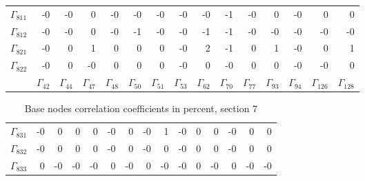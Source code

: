 {\begin{table}
\begin{center}
\begin{minipage}{\linewidth}
\begin{center}
\begin{envsmall}
\begin{center}
\begin{tabular}{rrrrrrrrrrrrrrr}
\( \Gamma_{811} \) &   -0 &   -0 &    0 &   -0 &   -0 &   -0 &   -0 &   -0 &   -1 &   -0 &    0 &   -0 &    0 &    0 \\
\( \Gamma_{812} \) &   -0 &   -0 &    0 &   -0 &   -1 &   -0 &   -0 &   -1 &   -1 &   -0 &   -0 &   -0 &   -0 &   -0 \\
\( \Gamma_{821} \) &   -0 &    0 &    1 &    0 &    0 &    0 &   -0 &    2 &   -1 &    0 &    1 &   -0 &    0 &    1 \\
\( \Gamma_{822} \) &   -0 &    0 &   -0 &    0 &    0 &    0 &   -0 &    0 &   -0 &    0 &    0 &   -0 &   -0 &    0 \\
 & \( \Gamma_{42} \) & \( \Gamma_{44} \) & \( \Gamma_{47} \) & \( \Gamma_{48} \) & \( \Gamma_{50} \) & \( \Gamma_{51} \) & \( \Gamma_{53} \) & \( \Gamma_{62} \) & \( \Gamma_{70} \) & \( \Gamma_{77} \) & \( \Gamma_{93} \) & \( \Gamma_{94} \) & \( \Gamma_{126} \) & \( \Gamma_{128} \)
\\\hline
\end{tabular}
\end{center}
\end{envsmall}
\ifhevea\else
\end{center}
\end{minipage}
\fi
\end{center}
\ifhevea\end{table}\fi
\ifhevea\begin{table}\fi%
\begin{center}
\ifhevea
\caption{Base nodes correlation coefficients in percent, section 7\label{tab:br-fit-corr7}}%
\else
\begin{minipage}{\linewidth}
\begin{center}
\label{tab:br-fit-corr7}%
\fi
\begin{envsmall}
\begin{center}
\renewcommand*{\arraystretch}{1.1}%
\begin{tabular}{rrrrrrrrrrrrrrr}
\hline
\( \Gamma_{831} \) &   -0 &    0 &    0 &    0 &   -0 &    0 &   -0 &    1 &   -0 &    0 &    0 &   -0 &    0 &    0 \\
\( \Gamma_{832} \) &   -0 &    0 &    0 &    0 &   -0 &    0 &   -0 &    0 &   -0 &    0 &    0 &   -0 &    0 &    0 \\
\( \Gamma_{833} \) &    0 &   -0 &   -0 &   -0 &    0 &   -0 &    0 &   -0 &   -0 &    0 &   -0 &    0 &   -0 &   -0 \\

\end{tabular}
\end{center}
\end{envsmall}
\end{center}
\end{minipage}
\end{center}
\end{table}}
